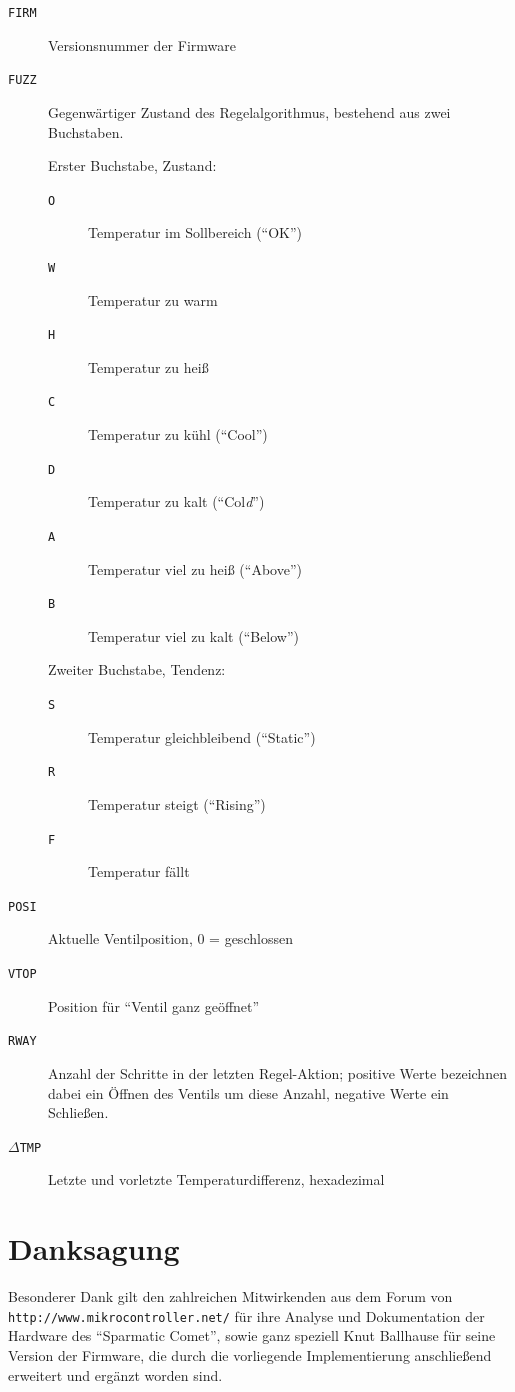 \documentclass[a5paper,twoside]{article}
\newcommand\SC{"`Sparmatic Comet"'}
\begin{document}
\begin{description}
\item[\texttt{FIRM}] Versionsnummer der Firmware
\item[\texttt{FUZZ}] Gegenwärtiger Zustand des Regelalgorithmus,
  bestehend aus zwei Buchstaben.

  Erster Buchstabe, Zustand:
  \begin{description}
  \item[\texttt{O}] Temperatur im Sollbereich ("`OK"')
  \item[\texttt{W}] Temperatur zu warm
  \item[\texttt{H}] Temperatur zu heiß
  \item[\texttt{C}] Temperatur zu kühl ("`Cool"')
  \item[\texttt{D}] Temperatur zu kalt ("`Col\emph{d}"')
  \item[\texttt{A}] Temperatur viel zu heiß ("`Above"')
  \item[\texttt{B}] Temperatur viel zu kalt ("`Below"')
  \end{description}

  Zweiter Buchstabe, Tendenz:
  \begin{description}
  \item[\texttt{S}] Temperatur gleichbleibend ("`Static"')
  \item[\texttt{R}] Temperatur steigt ("`Rising"')
  \item[\texttt{F}] Temperatur fällt
  \end{description}
\item[\texttt{POSI}] Aktuelle Ventilposition, 0 = geschlossen\label{menu:dbg-posi}
\item[\texttt{VTOP}] Position für "`Ventil ganz geöffnet"'
\item[\texttt{RWAY}] Anzahl der Schritte in der letzten Regel-Aktion; positive
  Werte bezeichnen dabei ein Öffnen des Ventils um diese Anzahl, negative
  Werte ein Schließen.
\item[\texttt{$\Delta$TMP}] Letzte und vorletzte Temperaturdifferenz, hexadezimal
\end{description}

\section {
  Danksagung
}

Besonderer Dank gilt den zahlreichen Mitwirkenden aus dem Forum von
\texttt{http://www.mikrocontroller.net/} für ihre Analyse und
Dokumentation der Hardware des \SC, sowie ganz speziell Knut Ballhause
für seine Version der Firmware, die durch die vorliegende
Implementierung anschließend erweitert und ergänzt worden sind.
\end{document}
